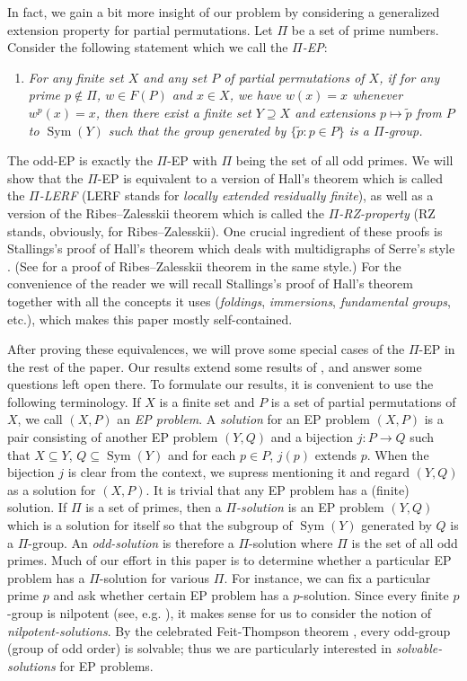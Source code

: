 \documentclass[10pt,a4paper]{amsart}
\theoremstyle{definition}
\theoremstyle{definition}
\numberwithin{equation}{section}
\begin{document}
In fact, we gain a bit more insight of our problem by considering a generalized extension property for partial permutations. Let $\Pi$ be a set of prime numbers. Consider the following statement which we call the \emph{$\Pi$-EP}:
\begin{enumerate}
\item[(d)] \emph{For any finite set $X$ and any set $P$ of partial permutations of $X$, if for any prime $p\not\in \Pi$, $w\in F(P)$ and $x\in X$, we have $w(x)=x$ whenever $w^p(x)=x$, then there exist a finite set $Y\supseteq X$ and extensions $p\mapsto \tilde{p}$ from $P$ to $\operatorname{Sym}(Y)$ such that the group generated by $\{\tilde{p}\colon p\in P\}$ is a $\Pi$-group. }
\end{enumerate}
The odd-EP is exactly the $\Pi$-EP with $\Pi$ being the set of all odd primes. We will show that the $\Pi$-EP is equivalent to a version of Hall's theorem which is called the \emph{$\Pi$-LERF} (LERF stands for \emph{locally extended residually finite}), as well as a version of the Ribes--Zalesskii theorem which is called the \emph{$\Pi$-RZ-property} (RZ stands, obviously, for Ribes--Zalesskii). One crucial ingredient of these proofs is Stallings's proof of Hall's theorem \cite{St83} which deals with multidigraphs of Serre's style \cite{SerreBook}. (See \cite{AS05, Zh25} for a proof of Ribes--Zalesskii theorem in the same style.) For the convenience of the reader we will recall Stallings's proof of Hall's theorem together with all the concepts it uses (\emph{foldings}, \emph{immersions}, \emph{fundamental groups}, etc.), which makes this paper mostly self-contained. 

After proving these equivalences, we will prove some special cases of the $\Pi$-EP in the rest of the paper. Our results extend some results of \cite{HPSW19}, and answer some questions left open there. To formulate our results, it is convenient to use the following terminology. If $X$ is a finite set and $P$ is a set of partial permutations of $X$, we call $(X, P)$ an \emph{EP problem}. A \emph{solution} for an EP problem $(X, P)$ is a pair consisting of another EP problem $(Y, Q)$ and a bijection $j\colon P\to Q$ such that $X\subseteq Y$, $Q\subseteq \operatorname{Sym}(Y)$ and for each $p\in P$, $j(p)$ extends $p$. When the bijection $j$ is clear from the context, we supress mentioning it and regard $(Y, Q)$ as a solution for $(X, P)$. It is trivial that any EP problem has a (finite) solution. If $\Pi$ is a set of primes, then a \emph{$\Pi$-solution} is an EP problem $(Y, Q)$  which is a solution for itself so that the subgroup of $\operatorname{Sym}(Y)$ generated by $Q$ is a $\Pi$-group. An \emph{odd-solution} is therefore a $\Pi$-solution where $\Pi$ is the set of all odd primes. Much of our effort in this paper is to determine whether a particular EP problem has a $\Pi$-solution for various $\Pi$. For instance, we can fix a particular prime $p$ and ask whether certain EP problem has a $p$-solution. Since every finite $p$-group is nilpotent (see, e.g. \cite[5.1.3]{RobinsonBook}), it makes sense for us to consider the notion of \emph{nilpotent-solutions}. By the celebrated Feit-Thompson theorem \cite{FT63}, every odd-group (group of odd order) is solvable; thus we are particularly interested in \emph{solvable-solutions} for EP problems. 
\end{document}
